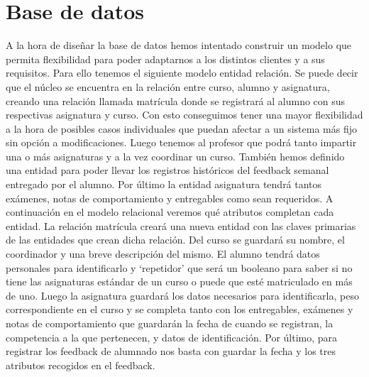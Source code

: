 \section{Base de datos}
A la hora de diseñar la base de datos hemos intentado construir un modelo que permita flexibilidad para poder adaptarnos a los distintos clientes y a sus requisitos. Para ello tenemos el siguiente modelo entidad relación.
Se puede decir que el núcleo se encuentra en la relación entre curso, alumno y asignatura, creando una relación llamada matrícula donde se registrará al alumno con sus respectivas asignatura y curso. Con esto conseguimos tener una mayor flexibilidad a la hora de posibles casos individuales que puedan afectar a un sistema más fijo sin opción a modificaciones. Luego tenemos al profesor que podrá tanto impartir una o más asignaturas y a la vez coordinar un curso. También hemos definido una entidad para poder llevar los registros históricos del feedback semanal entregado por el alumno. Por último la entidad asignatura tendrá tantos exámenes, notas de comportamiento y entregables como sean requeridos. A continuación en el modelo relacional veremos qué atributos completan cada entidad.
La relación matrícula creará una nueva entidad con las claves primarias de las entidades que crean dicha relación. Del curso se guardará su nombre, el coordinador y una breve descripción del mismo. El alumno tendrá datos personales para identificarlo y ‘repetidor’ que será un booleano para saber si no tiene las asignaturas estándar de un curso o puede que esté matriculado en más de uno. Luego la asignatura guardará los datos necesarios para identificarla, peso correspondiente en el curso y se completa tanto con los entregables, exámenes y notas de comportamiento que guardarán la fecha de cuando se registran, la competencia a la que pertenecen, y datos de identificación. Por último, para registrar los feedback de alumnado nos basta con guardar la fecha y los tres atributos recogidos en el feedback. 



